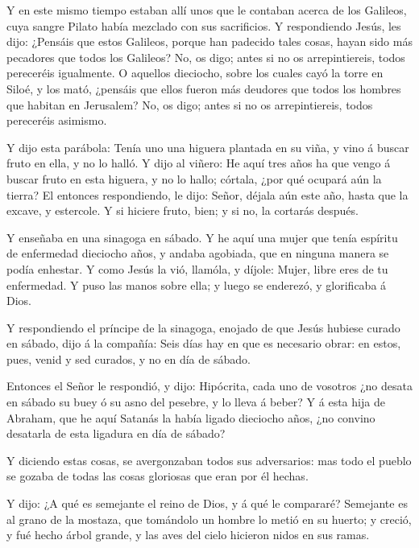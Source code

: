  Y en este mismo tiempo estaban allí unos que le contaban
acerca de los Galileos, cuya sangre Pilato había mezclado con sus
sacrificios.  Y respondiendo Jesús, les dijo: ¿Pensáis que
estos Galileos, porque han padecido tales cosas, hayan sido más
pecadores que todos los Galileos?  No, os digo; antes si no
os arrepintiereis, todos pereceréis igualmente.  O aquellos
dieciocho, sobre los cuales cayó la torre en Siloé, y los mató, ¿pensáis
que ellos fueron más deudores que todos los hombres que habitan en
Jerusalem?  No, os digo; antes si no os arrepintiereis,
todos pereceréis asimismo.

 Y dijo esta parábola: Tenía uno una higuera plantada en su
viña, y vino á buscar fruto en ella, y no lo halló.  Y dijo
al viñero: He aquí tres años ha que vengo á buscar fruto en esta
higuera, y no lo hallo; córtala, ¿por qué ocupará aún la tierra?
 El entonces respondiendo, le dijo: Señor, déjala aún este
año, hasta que la excave, y estercole.  Y si hiciere fruto,
bien; y si no, la cortarás después.

 Y enseñaba en una sinagoga en sábado.  Y he
aquí una mujer que tenía espíritu de enfermedad dieciocho años, y andaba
agobiada, que en ninguna manera se podía enhestar.  Y como
Jesús la vió, llamóla, y díjole: Mujer, libre eres de tu enfermedad.
 Y puso las manos sobre ella; y luego se enderezó, y
glorificaba á Dios.

 Y respondiendo el príncipe de la sinagoga, enojado de que
Jesús hubiese curado en sábado, dijo á la compañía: Seis días hay en que
es necesario obrar: en estos, pues, venid y sed curados, y no en día de
sábado.

 Entonces el Señor le respondió, y dijo: Hipócrita, cada
uno de vosotros ¿no desata en sábado su buey ó su asno del pesebre, y lo
lleva á beber?  Y á esta hija de Abraham, que he aquí
Satanás la había ligado dieciocho años, ¿no convino desatarla de esta
ligadura en día de sábado?

 Y diciendo estas cosas, se avergonzaban todos sus
adversarios: mas todo el pueblo se gozaba de todas las cosas gloriosas
que eran por él hechas.

 Y dijo: ¿A qué es semejante el reino de Dios, y á qué le
compararé?  Semejante es al grano de la mostaza, que
tomándolo un hombre lo metió en su huerto; y creció, y fué hecho árbol
grande, y las aves del cielo hicieron nidos en sus ramas.

